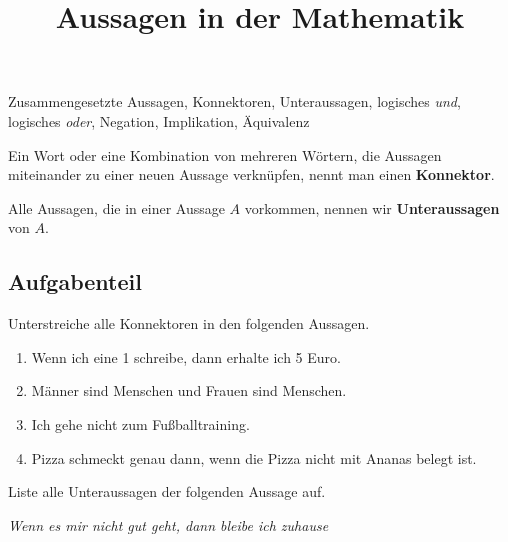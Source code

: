 \documentclass{uebungsblatt}
\title{Aussagen in der Mathematik}
\begin{document}
\maketitle
\begin{contents}
    Zusammengesetzte Aussagen, Konnektoren, Unteraussagen, logisches \emph{und}, logisches \emph{oder}, Negation, Implikation, Äquivalenz
\end{contents}


\begin{definition}
    Ein Wort oder eine Kombination von mehreren Wörtern, die Aussagen miteinander zu einer neuen Aussage verknüpfen, nennt man einen \textbf{Konnektor}.
\end{definition}

\begin{definition}
    Alle Aussagen, die in einer Aussage $A$ vorkommen, nennen wir \textbf{Unteraussagen} von $A$.
    \end{definition}

\subsection*{Aufgabenteil}

\begin{exercise}

    Unterstreiche alle Konnektoren in den folgenden Aussagen.

        \begin{enumerate}[label=\alph*)]
            \item Wenn ich eine 1 schreibe, dann erhalte ich 5 Euro.
            \item Männer sind Menschen und Frauen sind Menschen.
            \item Ich gehe nicht zum Fußballtraining.
            \item Pizza schmeckt genau dann, wenn die Pizza nicht mit Ananas belegt ist.
        \end{enumerate}

\end{exercise}

\begin{exercise}

    Liste alle Unteraussagen der folgenden Aussage auf.

    \begin{center}
        \emph{Wenn es mir nicht gut geht, dann bleibe ich zuhause}
    \end{center}

    \begin{answerbox}[1in]

    \end{answerbox}

\end{exercise}
\end{document}
